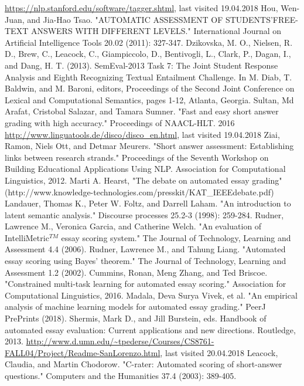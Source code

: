 \documentclass[rnd]{mas_report}
\begin{document}
\begin{thebibliography}{3}
 \url{https://nlp.stanford.edu/software/tagger.shtml}, last visited 19.04.2018
 Hou, Wen-Juan, and Jia-Hao Tsao. "AUTOMATIC ASSESSMENT OF STUDENTS'FREE-TEXT ANSWERS WITH DIFFERENT LEVELS." International Journal on Artificial Intelligence Tools 20.02 (2011): 327-347.
 Dzikovska, M. O., Nielsen, R. D., Brew, C., Leacock, C., Giampiccolo, D., Bentivogli, L., Clark, P., Dagan, I., and Dang, H. T. (2013). SemEval-2013 Task 7: The Joint Student Response Analysis and Eighth Recognizing Textual Entailment Challenge. In M. Diab, T. Baldwin, and M. Baroni, editors, Proceedings of the Second Joint Conference on Lexical and Computational Semantics, pages 1-12, Atlanta, Georgia.
 Sultan, Md Arafat, Cristobal Salazar, and Tamara Sumner. "Fast and easy short answer grading with high accuracy." Proceedings of NAACL-HLT. 2016
 \url{http://www.linguatools.de/disco/disco_en.html}, last visited 19.04.2018
 Ziai, Ramon, Niels Ott, and Detmar Meurers. "Short answer assessment: Establishing links between research strands." Proceedings of the Seventh Workshop on Building Educational Applications Using NLP. Association for Computational Linguistics, 2012.
 Marti A. Hearst, "The debate on automated essay grading" (http://www.knowledge-technologies.com/presskit/KAT\_IEEEdebate.pdf) 
 Landauer, Thomas K., Peter W. Foltz, and Darrell Laham. "An introduction to latent semantic analysis." Discourse processes 25.2-3 (1998): 259-284.
 Rudner, Lawrence M., Veronica Garcia, and Catherine Welch. "An evaluation of IntelliMetric$^{TM}$ essay scoring system." The Journal of Technology, Learning and Assessment 4.4 (2006).
 Rudner, Lawrence M., and Tahung Liang. "Automated essay scoring using Bayes' theorem." The Journal of Technology, Learning and Assessment 1.2 (2002).
 Cummins, Ronan, Meng Zhang, and Ted Briscoe. "Constrained multi-task learning for automated essay scoring." Association for Computational Linguistics, 2016.
 Madala, Deva Surya Vivek, et al. "An empirical analysis of machine learning models for automated essay grading." PeerJ PrePrints (2018).
 Shermis, Mark D., and Jill Burstein, eds. Handbook of automated essay evaluation: Current applications and new directions. Routledge, 2013.
\url{http://www.d.umn.edu/~tpederse/Courses/CS8761-FALL04/Project/Readme-SanLorenzo.html}, last visited 20.04.2018
  Leacock, Claudia, and Martin Chodorow. "C-rater: Automated scoring of short-answer questions." Computers and the Humanities 37.4 (2003): 389-405.

\end{thebibliography}
\end{document}

